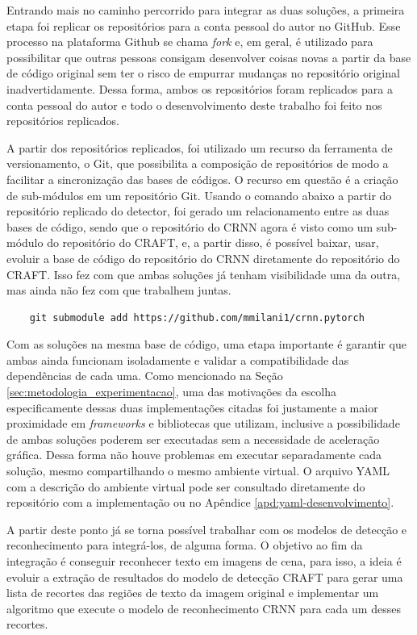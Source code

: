 Entrando mais no caminho percorrido para integrar as duas soluções, a primeira etapa foi replicar os repositórios para a conta pessoal do autor no GitHub. 
Esse processo na plataforma Github se chama \textit{fork} e, em geral, é utilizado para possibilitar que outras pessoas consigam desenvolver coisas 
novas a partir da base de código original sem ter o risco de empurrar mudanças no repositório original inadvertidamente. Dessa forma, ambos os repositórios 
foram replicados para a conta pessoal do autor e todo o desenvolvimento deste trabalho foi feito nos repositórios replicados.

A partir dos repositórios replicados, foi utilizado um recurso da ferramenta de versionamento, o Git, que possibilita a composição de repositórios de modo 
a facilitar a sincronização das bases de códigos. O recurso em questão é a criação de sub-módulos em um repositório Git. Usando o comando abaixo a partir 
do repositório replicado do detector, foi gerado um relacionamento entre as duas bases de código, sendo que o repositório do CRNN agora é visto como um 
sub-módulo do repositório do CRAFT, e, a partir disso, é possível baixar, usar, evoluir a base de código do repositório do CRNN diretamente do repositório 
do CRAFT. Isso fez com que ambas soluções já tenham visibilidade uma da outra, mas ainda não fez com que trabalhem juntas.

\begin{verbatim}
    git submodule add https://github.com/mmilani1/crnn.pytorch
\end{verbatim}

Com as soluções na mesma base de código, uma etapa importante é garantir que ambas ainda funcionam isoladamente e validar a compatibilidade das dependências 
de cada uma. Como mencionado na Seção \ref{sec:metodologia_experimentacao}, uma das motivações da escolha especificamente dessas duas implementações citadas foi 
justamente a maior proximidade em \textit{frameworks} e bibliotecas que utilizam, inclusive a possibilidade de ambas soluções poderem ser executadas sem a 
necessidade de aceleração gráfica. Dessa forma não houve problemas em executar separadamente cada solução, mesmo compartilhando o mesmo ambiente virtual. 
O arquivo YAML com a descrição do ambiente virtual pode ser consultado diretamente do repositório com a implementação ou no Apêndice \ref{apd:yaml-desenvolvimento}.

A partir deste ponto já se torna possível trabalhar com os modelos de detecção e reconhecimento para integrá-los, de alguma forma. O objetivo ao fim da integração 
é conseguir reconhecer texto em imagens de cena, para isso, a ideia é evoluir a extração de resultados do modelo de detecção CRAFT para gerar uma lista de 
recortes das regiões de texto da imagem original e implementar um algoritmo que execute o modelo de reconhecimento CRNN para cada um desses recortes.

